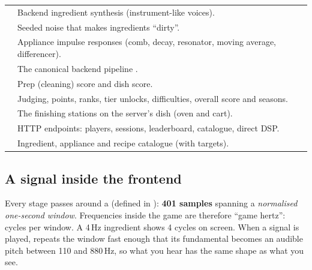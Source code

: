 \documentclass[11pt,a4paper]{article}
\begin{document}
\begin{longtable}{@{}P{6.1cm}P{9.4cm}@{}}
 & Backend ingredient synthesis (instrument-like voices). \\
 & Seeded noise that makes ingredients ``dirty''. \\
 & Appliance impulse responses (comb, decay, resonator, moving average, differencer). \\
 & The canonical backend pipeline . \\
 & Prep (cleaning) score and dish score. \\
 & Judging, points, ranks, tier unlocks, difficulties, overall score and seasons. \\
 & The finishing stations on the server's dish (oven and cart). \\
 & HTTP endpoints: players, sessions, leaderboard, catalogue, direct DSP. \\
 & Ingredient, appliance and recipe catalogue (with targets). \\
\bottomrule
\end{longtable}

\subsection{A signal inside the frontend}
Every stage passes around a  (defined in
): \textbf{401 samples} spanning a
\emph{normalised one-second window}. Frequencies inside the game are therefore
``game hertz'': cycles per window. A 4\,Hz ingredient shows 4 cycles on screen.
When a signal is played,  repeats the window fast
enough that its fundamental becomes an audible pitch between 110 and 880\,Hz, so
what you hear has the same shape as what you see.

\end{document}
